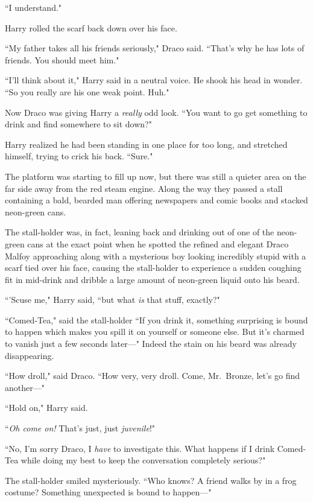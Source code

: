 ``I understand."

Harry rolled the scarf back down over his face.

``My father takes all his friends seriously," Draco said. ``That's why he has lots of friends. You should meet him."

``I'll think about it," Harry said in a neutral voice. He shook his head in wonder. ``So you really are his one weak point. Huh."

Now Draco was giving Harry a \emph{really} odd look. ``You want to go get something to drink and find somewhere to sit down?"

Harry realized he had been standing in one place for too long, and stretched himself, trying to crick his back. ``Sure."

The platform was starting to fill up now, but there was still a quieter area on the far side away from the red steam engine. Along the way they passed a stall containing a bald, bearded man offering newspapers and comic books and stacked neon-green cans.

The stall-holder was, in fact, leaning back and drinking out of one of the neon-green cans at the exact point when he spotted the refined and elegant Draco Malfoy approaching along with a mysterious boy looking incredibly stupid with a scarf tied over his face, causing the stall-holder to experience a sudden coughing fit in mid-drink and dribble a large amount of neon-green liquid onto his beard.

``'Scuse me," Harry said, ``but what \emph{is} that stuff, exactly?"

``Comed-Tea," said the stall-holder ``If you drink it, something surprising is bound to happen which makes you spill it on yourself or someone else. But it's charmed to vanish just a few seconds later—" Indeed the stain on his beard was already disappearing.

``How droll," said Draco. ``How very, very droll. Come, Mr.~Bronze, let's go find another—"

``Hold on," Harry said.

``\emph{Oh come on!} That's just, just \emph{juvenile}!"

``No, I'm sorry Draco, I \emph{have} to investigate this. What happens if I drink Comed-Tea while doing my best to keep the conversation completely serious?"

The stall-holder smiled mysteriously. ``Who knows? A friend walks by in a frog costume? Something unexpected is bound to happen—"

